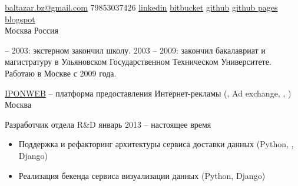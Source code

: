\documentclass[unicode, 10pt, a4paper, oneside, fleqn]{article}
\begin{document}
\sloppy  %


\nobreakvspace{0.3em}  %

\noindent\href{mailto:baltazar.bz@gmail.com}{baltazar.bz\mbox{}@\mbox{}gmail.com}\sbull
\textsmaller{+}79853037426\sbull
\href{http://ru.linkedin.com/pub/yuri-bochkarev/21/3a9/555}{linkedin}
\sbull
\href{https://bitbucket.org/balta2ar}{bitbucket}
\sbull
\href{https://github.com/balta2ar}{github}
\sbull
\href{http://balta2ar.github.com}{github pages}
\sbull
\href{http://baltazar-bz.blogspot.com/}{blogspot}
\\
Москва\sbull
Россия


 -- 2003: экстерном закончил школу. 2003 -- 2009: закончил бакалавриат и
магистратуру в Ульяновском Государственном Техническом Университете. Работаю в
Москве с 2009 года.



\job  %
    {\href{http://www.iponweb.com}{IPONWEB} -- платформа предоставления
     Интернет-рекламы (, Ad exchange, , )}
    {Москва}
    {
        \position  %
            {Разработчик отдела R\&D}
            {январь 2013 -- настоящее время}
            {
                \begin{itemize}
                \item{Поддержка и рефакторинг архитектуры сервиса доставки
                      данных (Python, , Django)}
                \item{Реализация бекенда сервиса визуализации данных
                      (Python, Django)}
                \end{itemize}
            }
    }
\end{document}
